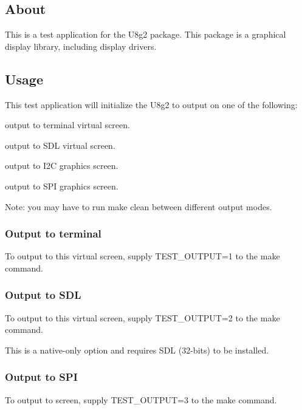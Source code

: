 \subsection*{About}

This is a test application for the U8g2 package. This package is a graphical display library, including display drivers.

\subsection*{Usage}

This test application will initialize the U8g2 to output on one of the following\+:


\begin{DoxyItemize}
\item output to terminal virtual screen.
\item output to S\+DL virtual screen.
\item output to I2C graphics screen.
\item output to S\+PI graphics screen.
\end{DoxyItemize}

Note\+: you may have to run {\ttfamily make clean} between different output modes.

\subsubsection*{Output to terminal}

To output to this virtual screen, supply {\ttfamily T\+E\+S\+T\+\_\+\+O\+U\+T\+P\+UT=1} to the {\ttfamily make} command.

\subsubsection*{Output to S\+DL}

To output to this virtual screen, supply {\ttfamily T\+E\+S\+T\+\_\+\+O\+U\+T\+P\+UT=2} to the {\ttfamily make} command.

This is a native-\/only option and requires S\+DL (32-\/bits) to be installed.

\subsubsection*{Output to S\+PI}

To output to screen, supply {\ttfamily T\+E\+S\+T\+\_\+\+O\+U\+T\+P\+UT=3} to the {\ttfamily make} command.


